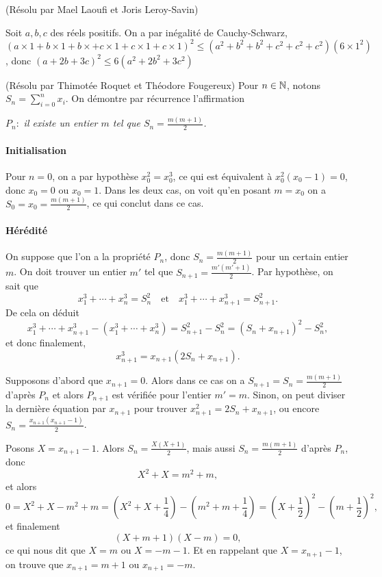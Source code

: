 \begin{sol}[80](Résolu par Ma\¨el Laoufi et Joris Leroy-Savin)

Soit $a,b,c$ des r\'eels positifs. On a par in\'egalit\'e de Cauchy-Schwarz,\\
$(a \times 1+ b\times 1+b \times+ c\times 1+c \times 1 +c\times 1)^2 \leq (a^2+b^2+b^2+c^2+c^2+c^2)(6 \times 1^2)$,
donc $(a+2b+3c)^2 \leq 6(a^2+2b^2+3c^2)$



\end{sol}

\begin{sol}[82](R\'esolu par Thimot\'ee Roquet et Th\'eodore Fougereux)
Pour $n\in\mathbb{N}$, notons $S_n=\sum_{i=0}^n x_i$. On d\'emontre par r\'ecurrence l'affirmation
\begin{center}
$P_n:$ {\it il existe un entier $m$ tel que $S_n=\frac{m(m+1)}{2}$.}
\end{center} 

\paragraph*{Initialisation} Pour $n=0$, on a par hypoth\`ese $x_0^2=x_0^3$, ce qui est \'equivalent \`a $x_0^2(x_0-1)=0$, donc $x_0=0$ ou $x_0=1$. Dans les deux cas, on voit qu'en posant $m=x_0$ on a $S_0=x_0=\frac{m(m+1)}{2}$, ce qui conclut dans ce cas.

\paragraph*{H\'er\'edit\'e} On suppose que l'on a la propri\'et\'e $P_n$, donc $S_n=\frac{m(m+1)}{2}$ pour un certain entier $m$. On doit trouver un entier $m'$ tel que $S_{n+1}=\frac{m'(m'+1)}{2}$. Par hypoth\`ese, on sait que
\[x_1^3+\cdots+x_n^3=S_n^2\quad\text{et}\quad x_1^3+\cdots+x_{n+1}^3=S_{n+1}^2.\]
De cela on d\'eduit
\[x_1^3+\cdots+x_{n+1}^3-(x_1^3+\cdots+x_{n}^3)=S_{n+1}^2-S_n^2=(S_n+x_{n+1})^2-S_n^2,\]
et donc finalement,
\[x_{n+1}^3=x_{n+1}(2S_n+x_{n+1}).\]

Supposons d'abord que $x_{n+1}=0$. Alors dans ce cas on a $S_{n+1}=S_n=\frac{m(m+1)}{2}$ d'apr\`es $P_n$ et alors $P_{n+1}$ est v\'erifi\'ee pour l'entier $m'=m$. Sinon, on peut diviser la derni\`ere \'equation par $x_{n+1}$ pour trouver $x_{n+1}^2=2S_n+x_{n+1}$, ou encore $S_n=\frac{x_{n+1}(x_{n+1}-1)}{2}$.

Posons $X=x_{n+1}-1$. Alors $S_n=\frac{X(X+1)}{2}$, mais aussi $S_n=\frac{m(m+1)}{2}$ d'apr\`es  $P_n$, donc \[X^2+X=m^2+m,\]
et alors
\[0=X^2+X -m^2+m=\left(X^2+X+\frac14\right) -\left(m^2+m+\frac14\right)=\left(X+\frac12\right)^2-\left(m+\frac12\right)^2,\]
et finalement
\[(X+m+1)(X-m)=0,\]
ce qui nous dit que $X=m$ ou $X=-m-1$. Et en rappelant que $X=x_{n+1}-1$, on trouve que $x_{n+1}=m+1$ ou $x_{n+1}=-m$.


\end{sol}
